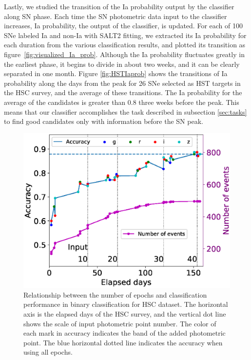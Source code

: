 \documentclass[useamsfonts]{pasj01}
\begin{document}
Lastly, we studied the transition of the Ia probability output by the classifier along SN phase.
Each time the SN photometric data input to the classifier increases, Ia probability, the output of the classifier, is updated.
For each of 100 SNe labeled Ia and non-Ia with SALT2 fitting, we extracted its Ia probability for each duration from the various classification results, and plotted its transition as figure\ \ref{fig:visualized_Ia_prob}.
Although the Ia probability fluctuates greatly in the earliest phase, it begins to divide in about two weeks, and it can be clearly separated in one month.
Figure \ref{fig:HSTIaprob} shows the transitions of Ia probability along the days from the peak for 26 SNe selected as HST targets in the HSC survey, and the average of these transitions.
The Ia probability for the average of the candidates is greater than 0.8 three weeks before the peak.
This means that our classifier accomplishes the task described in subsection \ref{sec:tasks} to find good candidates only with information before the SN peak.
%
\begin{figure}[htbp]
  \begin{center}
     \includegraphics[width=\columnwidth]{figures/n_observations_v2_case0.eps}
  \end{center}
  \caption{%
  Relationship between the number of epochs and classification performance in binary classification for HSC dataset. 
  The horizontal axis is the elapsed days of the HSC survey, and the vertical dot line shows the scale of input photometric point number. 
  The color of each mark in accuracy indicates the band of the added photometric point. 
  The blue horizontal dotted line indicates the accuracy when using all epochs.
  }%
  \label{fig:n_observations}
\end{figure}
\end{document}
